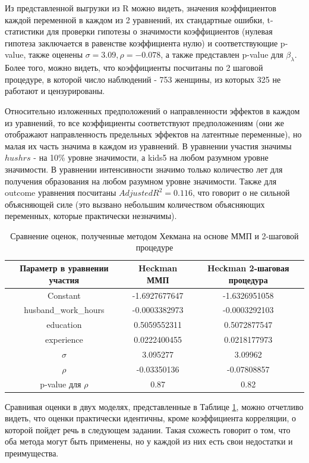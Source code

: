 \documentclass[a4paper,12pt]{article}
\begin{document}
 Из представленной выгрузки из R можно видеть, значения коэффициентов каждой переменной в каждом из 2 уравнений, их стандартные ошибки,  t-статистики для проверки гипотезы о значимости коэффициентов (нулевая гипотеза заключается в равенстве коэффициента нулю) и соответствующие p-value, также оценены $\sigma = 3.09, \rho = -0.078$, а также представлен p-value для $\beta_{\lambda}$. Более того, можно видеть, что коэффициенты посчитаны по 2 шаговой процедуре, в которой число наблюдений - 753 женщины, из которых 325 не работают и цензурированы. 

Относительно изложенных предположений о направленности эффектов в каждом из уравнений, то все коэффициенты соответствуют предположениям (они же отображают направленность предельных эффектов на латентные переменные), но малая их часть значима в каждом из уравнений. В уравнении участия значимы $hushrs$ - на 10\% уровне значимости, а kids5 на любом разумном уровне значимости. В уравнении интенсивности значимо только количество лет для получения образования на любом разумном уровне значимости. Также для outcome уравнения посчитаны $Adjusted R^2 = 0.116$, что говорит о не сильной объясняющей силе (это вызвано небольшим количеством объясняющих переменных, которые практически незначимы).

\begin{table}[!h]
	\caption{Сравнение оценок, полученные методом Хекмана на основе ММП и 2-шаговой процедуре}
	\label{hekman3}
	\centering
	\small
	\begin{tabular}{|c|c|c|}
		\hline
		Параметр в уравнении участия& Heckman  ММП & Heckman 2-шаговая процедура \\ 
		\hline
Constant &-1.6927677647 &-1.6326951058\\
\hline
husband\_work\_hours     & -0.0003382973 &-0.0003292103\\
\hline
education         &0.5059552311 & 0.5072877547\\
\hline
experience        &0.0222400455 & 0.0218177973\\
\hline
$\sigma$& 3.095277 & 3.09962\\
\hline 
$\rho $&-0.03350136  & -0.07808857\\
		\hline
p-value для $\rho $&0.87  & 0.82\\
\hline
	\end{tabular}
\end{table}

Сравнивая оценки в двух моделях, представленные в Таблице \ref{hekman3}, можно отчетливо видеть, что оценки практически идентичны, кроме коэффициента корреляции, о которой пойдет речь в следующем задании. Такая схожесть говорит о том, что оба метода могут быть применены, но у каждой из них есть свои недостатки и преимущества.
\end{document}
